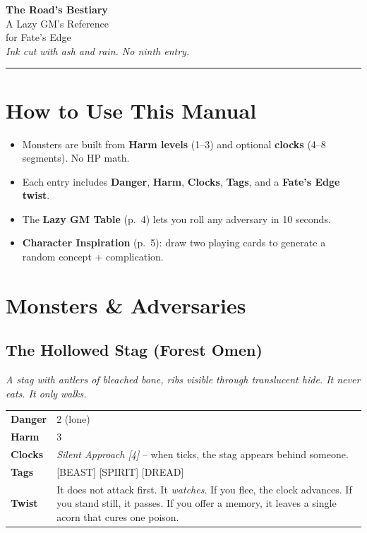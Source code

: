 \documentclass[10pt,twocolumn]{article}
\newcommand{\kw}[1]{\textbf{#1}}     %
\begin{document}
\thispagestyle{empty}
\begin{center}
    {\LARGE\bfseries The Road's Bestiary}\\[2mm]
    {\large A Lazy GM's Reference \\ for Fate's Edge}\\[2mm]
    {\small \textit{Ink cut with ash and rain. No ninth entry.}}
\end{center}
\vspace{1cm}
\hrule
\vspace{0.5cm}

\section*{How to Use This Manual}
\begin{itemize}
    \item Monsters are built from \kw{Harm levels} (1--3) and optional \kw{clocks} (4--8 segments). No HP math.
    \item Each entry includes \kw{Danger}, \kw{Harm}, \kw{Clocks}, \kw{Tags}, and a \kw{Fate's Edge twist}.
    \item The \kw{Lazy GM Table} (p.~4) lets you roll any adversary in 10 seconds.
    \item \kw{Character Inspiration} (p.~5): draw two playing cards to generate a random concept + complication.
\end{itemize}

\section*{Monsters \& Adversaries}

\subsection*{The Hollowed Stag (Forest Omen)}
\emph{A stag with antlers of bleached bone, ribs visible through translucent hide. It never eats. It only walks.}
\begin{tabular}{@{}ll}
\toprule
\kw{Danger} & 2 (lone) \\
\kw{Harm}   & 3 \\
\kw{Clocks} & \textit{Silent Approach [4]} -- when ticks, the stag appears behind someone. \\
\kw{Tags}   & [BEAST] [SPIRIT] [DREAD] \\
\kw{Twist}  & It does not attack first. It \emph{watches}. If you flee, the clock advances. If you stand still, it passes. If you offer a memory, it leaves a single acorn that cures one poison. \\
\bottomrule
\end{tabular}
\end{document}
